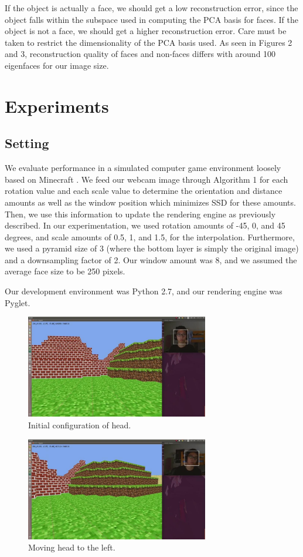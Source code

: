 \documentclass[10pt,twocolumn,letterpaper]{article}
\begin{document}
If the object is actually a face, we should get a low reconstruction error, since the object falls within the subspace used in computing the PCA basis for faces. If the object is not a face, we should get a higher reconstruction error. Care must be taken to restrict the dimensionality of the PCA basis used. As seen in Figures 2 and 3, reconstruction quality of faces and non-faces differs with around 100 eigenfaces for our image size.

\section*{Experiments}

\subsection*{Setting}
We evaluate performance in a simulated computer game environment loosely based
on Minecraft \cite{minecraft}. We feed our webcam image through Algorithm 1 for each rotation
value and each scale value to determine the orientation and distance amounts as well as
the window position which minimizes SSD for these amounts. Then, we use this
information to update the rendering engine as previously described. In our experimentation,
we used rotation amounts of -45, 0, and 45 degrees, and scale amounts of 0.5, 1, and 1.5,
for the interpolation. Furthermore, we used a pyramid size of 3 (where the bottom
layer is simply the original image) and a downsampling factor of 2. Our window amount
was 8, and we assumed the average face size to be 250 pixels.

Our development environment was Python 2.7, and our rendering engine was Pyglet.
\begin{figure}[ht!]
\centering
\includegraphics[width=80mm]{left_trans.jpg}
\caption{Initial configuration of head.\label{overflow}}
\end{figure}

\begin{figure}[ht!]
\centering
\includegraphics[width=80mm]{right_trans.jpg}
\caption{Moving head to the left.\label{overflow}}
\end{figure}
\end{document}
